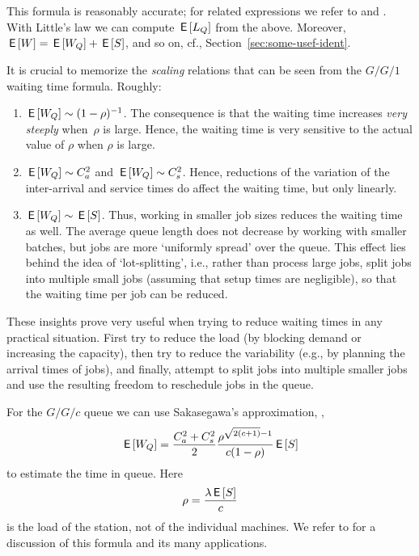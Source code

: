 This formula is reasonably accurate; for related expressions we refer
to \citet{bolch06:_queuein_networ_markov_chain} and
\citet{hall91:_queuein_method_servic_manuf}. With Little's law we can
compute $\,\mathsf{E}\left[L_Q\right]$ from the above. Moreover, $\,\mathsf{E}\left[W\right] = \,\mathsf{E}\left[W_Q\right] + \,\mathsf{E}\left[S\right]$,
and so on, cf., Section~\ref{sec:some-usef-ident}.



It is crucial to memorize the \emph{scaling} relations that can be
seen from the $G/G/1$ waiting time formula. Roughly:
\begin{enumerate}
\item $\,\mathsf{E}\left[W_Q\right] \sim (1-\rho)^{-1}$. The consequence is that the waiting
  time increases \emph{very steeply} when~$\rho$ is large. Hence, the waiting time is
  very sensitive to the actual value of $\rho$ when $\rho$ is large.
\item $\,\mathsf{E}\left[W_Q\right] \sim C_a^2$ and $\,\mathsf{E}\left[W_Q\right] \sim C_s^2$. Hence, reductions
  of the variation of the inter-arrival and service times do affect the
  waiting time, but only linearly.
\item $\,\mathsf{E}\left[W_Q\right] \sim \,\mathsf{E}\left[S\right]$. Thus, working in smaller job sizes reduces
  the waiting time as well. The average queue length does not decrease by
  working with smaller batches, but jobs are more `uniformly spread'
  over the queue. This effect lies behind the idea of
  `lot-splitting', i.e., rather than process large jobs, split jobs
  into multiple small jobs (assuming that setup times are negligible),
  so that the waiting time per job can be reduced.
\end{enumerate}

These insights prove very useful when trying to reduce waiting times
in any practical situation. First try to reduce the load (by blocking
demand or increasing the capacity), then try to reduce the variability
(e.g., by planning the arrival times of jobs), and finally, attempt to
split jobs into multiple smaller jobs and use the resulting freedom to
reschedule jobs in the queue.

For the $G/G/c$ queue we can use Sakasegawa's approximation, \cite{sakasegawa77:_l}, 
\begin{equation}\label{eq:7}
  \,\mathsf{E}\left[W_Q\right] = \frac{C_a^2+C_s^2}2 \frac{\rho^{\sqrt{2(c+1)}-1}}{c(1-\rho)} \,\mathsf{E}\left[S\right]
\end{equation}
to estimate the time in queue.  Here
\begin{equation*}
  \rho = \frac{\lambda \,\mathsf{E}\left[S\right]}{c}
\end{equation*}
is the load of the station, not of the individual machines. We refer to \cite{hopp08:_factor_physic} for a discussion of this formula and its many applications.


